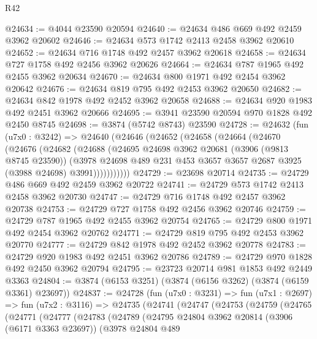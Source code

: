 \begin{lexlean}{R42}
\begin{coremodule}
@24634 := @4044 @23590 @20594
@24640 := @24634 @486 @669 @492 @2459 @3962 @20602
@24646 := @24634 @573 @1742 @2413 @2458 @3962 @20610
@24652 := @24634 @716 @1748 @492 @2457 @3962 @20618
@24658 := @24634 @727 @1758 @492 @2456 @3962 @20626
@24664 := @24634 @787 @1965 @492 @2455 @3962 @20634
@24670 := @24634 @800 @1971 @492 @2454 @3962 @20642
@24676 := @24634 @819 @795 @492 @2453 @3962 @20650
@24682 := @24634 @842 @1978 @492 @2452 @3962 @20658
@24688 := @24634 @920 @1983 @492 @2451 @3962 @20666
@24695 := @3941 @23590 @20594 @970 @1828 @492 @2450 @8745
@24698 := @3874 (@5742 @8743) @23590
@24728 := @24632
    (fun (u7x0 : @3242) =>
    @24640
      (@24646
        (@24652
          (@24658
            (@24664
              (@24670
                (@24676
                  (@24682
                    (@24688
                      (@24695
                        @24698
                        @3962
                        @20681
                        (@3906 (@9813 @8745 @23590))
                        (@3978
                          @24698
                          @489
                          @231
                          @453
                          @3657
                          @3657
                          @2687
                          @3925
                          (@3988 @24698)
                          @3991)))))))))))
@24729 := @23698 @20714
@24735 := @24729 @486 @669 @492 @2459 @3962 @20722
@24741 := @24729 @573 @1742 @2413 @2458 @3962 @20730
@24747 := @24729 @716 @1748 @492 @2457 @3962 @20738
@24753 := @24729 @727 @1758 @492 @2456 @3962 @20746
@24759 := @24729 @787 @1965 @492 @2455 @3962 @20754
@24765 := @24729 @800 @1971 @492 @2454 @3962 @20762
@24771 := @24729 @819 @795 @492 @2453 @3962 @20770
@24777 := @24729 @842 @1978 @492 @2452 @3962 @20778
@24783 := @24729 @920 @1983 @492 @2451 @3962 @20786
@24789 := @24729 @970 @1828 @492 @2450 @3962 @20794
@24795 := @23723 @20714 @981 @1853 @492 @2449 @3363
@24804 := @3874 (@6153 @3251) (@3874 (@6156 @3262) (@3874 (@6159 @3361) @23697))
@24837 := @24728
    (fun (u7x0 : @3231) =>
    fun (u7x1 : @2697) =>
    fun (u7x2 : @3116) =>
    @24735
      (@24741
        (@24747
          (@24753
            (@24759
              (@24765
                (@24771
                  (@24777
                    (@24783
                      (@24789
                        (@24795
                          @24804
                          @3962
                          @20814
                          (@3906 (@6171 @3363 @23697))
                          (@3978
                            @24804
                            @489

\end{coremodule}
\end{lexlean}
